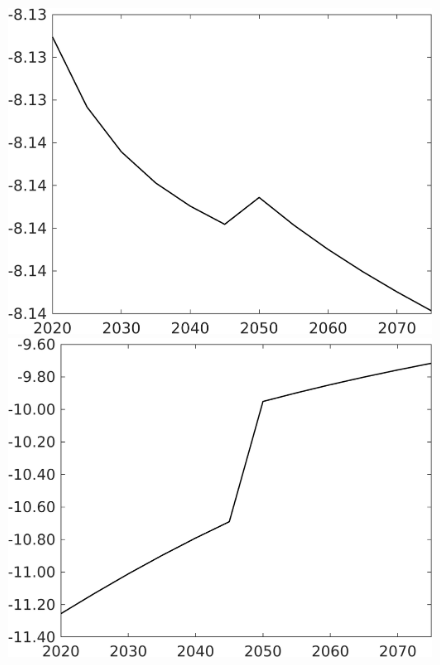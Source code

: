 \documentclass[12pt]{article}
\begin{document}
\begin{figure}[h!!]
\begin{minipage}[]{0.32\textwidth}
	\end{minipage}
	\begin{minipage}[]{0.32\textwidth}
		\includegraphics[width=1\textwidth]{../../codding_model/own_basedOnFried/optimalPol_010922_revision/figures/all_13Sept22/CompTaufPER_bytaul_Reg0_Ln_spillover0_nsk1_xgr0_knspil0_sep1_LFlimit1_emsbase0_countec0_GovRev0_etaa0.79_lgd0.png}
	\end{minipage}			
	\begin{minipage}[]{0.32\textwidth}
		\includegraphics[width=1\textwidth]{../../codding_model/own_basedOnFried/optimalPol_010922_revision/figures/all_13Sept22/CompTaufPER_bytaul_Reg0_GFF_spillover0_nsk1_xgr0_knspil0_sep1_LFlimit1_emsbase0_countec0_GovRev0_etaa0.79_lgd0.png}

\end{minipage}
\end{figure}
\end{document}
